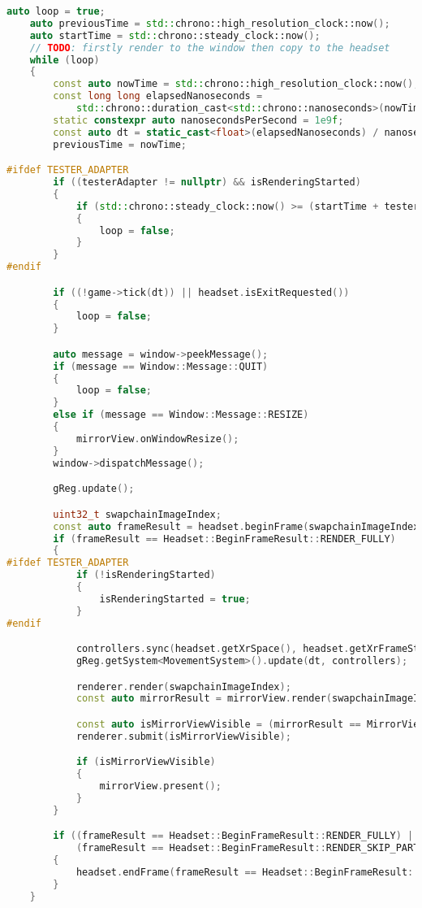 \label{main_loop}
\begin{lstlisting}[language=c++, caption=Engine main loop (./engine/src/core/core.cpp)]
    auto loop = true;
    auto previousTime = std::chrono::high_resolution_clock::now();
    auto startTime = std::chrono::steady_clock::now();
    // TODO: firstly render to the window then copy to the headset
    while (loop)
    {
        const auto nowTime = std::chrono::high_resolution_clock::now();
        const long long elapsedNanoseconds =
            std::chrono::duration_cast<std::chrono::nanoseconds>(nowTime - previousTime).count();
        static constexpr auto nanosecondsPerSecond = 1e9f;
        const auto dt = static_cast<float>(elapsedNanoseconds) / nanosecondsPerSecond;
        previousTime = nowTime;

#ifdef TESTER_ADAPTER 
        if ((testerAdapter != nullptr) && isRenderingStarted)
        {
            if (std::chrono::steady_clock::now() >= (startTime + testerAdapter->renderingDuration))
            {
                loop = false;
            }
        }
#endif

        if ((!game->tick(dt)) || headset.isExitRequested())
        {
            loop = false;
        }

        auto message = window->peekMessage();
        if (message == Window::Message::QUIT)
        {
            loop = false;
        }
        else if (message == Window::Message::RESIZE)
        {
            mirrorView.onWindowResize();
        }
        window->dispatchMessage();

        gReg.update();

        uint32_t swapchainImageIndex;
        const auto frameResult = headset.beginFrame(swapchainImageIndex);
        if (frameResult == Headset::BeginFrameResult::RENDER_FULLY)
        {
#ifdef TESTER_ADAPTER
            if (!isRenderingStarted)
            {
                isRenderingStarted = true;
            }
#endif

            controllers.sync(headset.getXrSpace(), headset.getXrFrameState().predictedDisplayTime);
            gReg.getSystem<MovementSystem>().update(dt, controllers);

            renderer.render(swapchainImageIndex);
            const auto mirrorResult = mirrorView.render(swapchainImageIndex);

            const auto isMirrorViewVisible = (mirrorResult == MirrorView::RenderResult::VISIBLE);
            renderer.submit(isMirrorViewVisible);

            if (isMirrorViewVisible)
            {
                mirrorView.present();
            }
        }

        if ((frameResult == Headset::BeginFrameResult::RENDER_FULLY) ||
            (frameResult == Headset::BeginFrameResult::RENDER_SKIP_PARTIALLY))
        {
            headset.endFrame(frameResult == Headset::BeginFrameResult::RENDER_SKIP_PARTIALLY);
        }
    }
\end{lstlisting}

